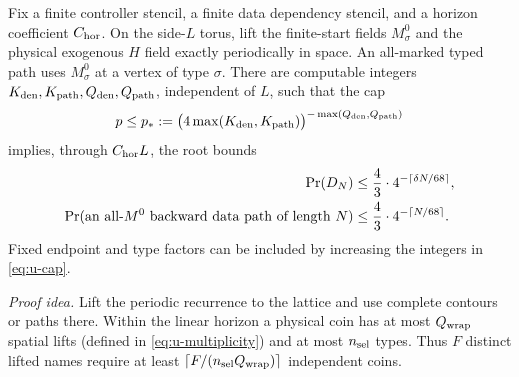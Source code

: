 \begin{lemma}\label{u:wrapped}
Fix a finite controller stencil, a finite data dependency stencil, and a
horizon coefficient \(C_{\rm hor}\). On the side-\(L\) torus, lift the
finite-start fields \(M^0_\sigma\) and the physical exogenous \(H\) field exactly
periodically in space. An all-marked typed path uses \(M^0_\sigma\)
at a vertex of type \(\sigma\). There are computable integers
\(K_{\rm den},K_{\rm path},Q_{\rm den},Q_{\rm path}\), independent of
\(L\), such that the cap
\begin{equation}\label{eq:u-cap}
 p\le p_*:=\bigl(4\max(K_{\rm den},K_{\rm path})\bigr)^{-
                         \max(Q_{\rm den},Q_{\rm path})}
\end{equation}
implies, through \(C_{\rm hor}L\), the root bounds
\begin{align}
 \Pr(D_N)&\le\frac43\cdot4^{-\lceil\delta N/68\rceil},\label{eq:u-root-bounds}\\*
 \Pr(\textup{an all-}M^0\textup{ backward data path of length }N)
 &\le\frac43\cdot4^{-\lceil N/68\rceil}.\label{eq:u-root-path}
\end{align}
Fixed endpoint and type factors can be included by increasing the
integers in \eqref{eq:u-cap}.
\end{lemma}
\par\noindent\emph{Proof idea.} Lift the periodic recurrence to the lattice and use complete contours or paths there. Within the linear horizon a physical coin has at most \(Q_{\rm wrap}\) spatial lifts (defined in \eqref{eq:u-multiplicity}) and at most \(n_{\rm sel}\) types. Thus \(F\) distinct lifted names require at least \(\lceil F/(n_{\rm sel}Q_{\rm wrap})\rceil\) independent coins.

